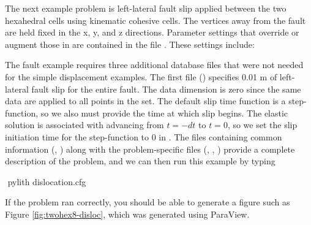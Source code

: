 The next example problem is left-lateral fault slip applied between
the two hexahedral cells using kinematic cohesive cells. The vertices
away from the fault are held fixed in the x, y, and z directions.
Parameter settings that override or augment those in 
are contained in the file . These settings
include:
\begin{inventory}
\end{inventory}
The fault example requires three additional database files that were
not needed for the simple displacement examples. The first file
() specifies 0.01 m of
left-lateral fault slip for the entire fault.  The data dimension is
zero since the same data are applied to all points in the set. The
default slip time function is a step-function, so we also must provide
the time at which slip begins. The elastic solution is associated with
advancing from $t=-dt$ to $t=0$, so we set the slip initiation time
for the step-function to 0 in
.  The files containing
common information (, )
along with the problem-specific files (,
,
) provide a complete
description of the problem, and we can then run this example by typing
\begin{shell}
$$ pylith dislocation.cfg
\end{shell}
If the problem ran correctly, you should be able to generate a figure
such as Figure \vref{fig:twohex8-disloc}, which was generated using
ParaView.

